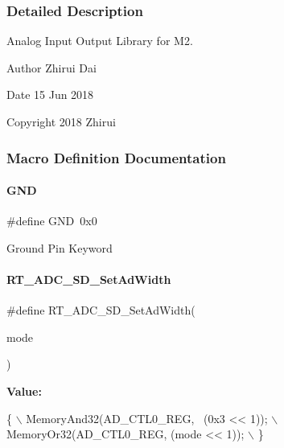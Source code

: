 \subsubsection{Detailed Description}
Analog Input Output Library for M2. 

\begin{DoxyAuthor}{Author}
Zhirui Dai 
\end{DoxyAuthor}
\begin{DoxyDate}{Date}
15 Jun 2018 
\end{DoxyDate}
\begin{DoxyCopyright}{Copyright}
2018 Zhirui 
\end{DoxyCopyright}


\subsubsection{Macro Definition Documentation}
\mbox{\label{a00002_a2c058e9d24bb65c1a6ad2d439b2976ab}} 
\paragraph{\texorpdfstring{G\+ND}{GND}}
{\footnotesize\ttfamily \#define G\+ND~0x0}

Ground Pin Keyword \mbox{\label{a00002_acb989d89893ac99af984979cb9e8df2a}} 
\paragraph{\texorpdfstring{R\+T\+\_\+\+A\+D\+C\+\_\+\+S\+D\+\_\+\+Set\+Ad\+Width}{RT\_ADC\_SD\_SetAdWidth}}
{\footnotesize\ttfamily \#define R\+T\+\_\+\+A\+D\+C\+\_\+\+S\+D\+\_\+\+Set\+Ad\+Width(\begin{DoxyParamCaption}\item[{}]{mode }\end{DoxyParamCaption})}

{\bfseries Value\+:}
\begin{DoxyCode}
\{                                          \(\backslash\)
        MemoryAnd32(AD\_CTL0\_REG, ~(0x3 << 1)); \(\backslash\)
        MemoryOr32(AD\_CTL0\_REG, (mode << 1));  \(\backslash\)
    \}
\end{DoxyCode}



